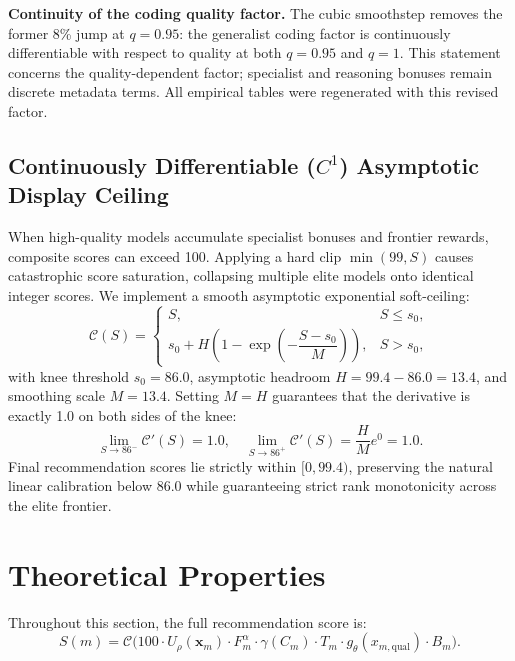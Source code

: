\documentclass[pdflatex,sn-mathphys-num]{sn-jnl}
\theoremstyle{thmstyleone}
\theoremstyle{thmstylethree}
\begin{document}
\textbf{Continuity of the coding quality factor.} The cubic smoothstep removes the former 8\% jump at $q=0.95$: the generalist coding factor is continuously differentiable with respect to quality at both $q=0.95$ and $q=1$. This statement concerns the quality-dependent factor; specialist and reasoning bonuses remain discrete metadata terms. All empirical tables were regenerated with this revised factor.

\subsection{Continuously Differentiable ($C^1$) Asymptotic Display Ceiling}\label{subsec:ceiling}

When high-quality models accumulate specialist bonuses and frontier rewards, composite scores can exceed 100. Applying a hard clip $\min(99, S)$ causes catastrophic score saturation, collapsing multiple elite models onto identical integer scores. We implement a smooth asymptotic exponential soft-ceiling:
\begin{equation}\label{eq:soft_ceiling}
\mathcal{C}(S) = \begin{cases}
S, & S \le s_0, \\[4pt]
s_0 + H \left( 1 - \exp\left( -\dfrac{S - s_0}{M} \right) \right), & S > s_0,
\end{cases}
\end{equation}
with knee threshold $s_0 = 86.0$, asymptotic headroom $H = 99.4 - 86.0 = 13.4$, and smoothing scale $M = 13.4$. Setting $M = H$ guarantees that the derivative is exactly 1.0 on both sides of the knee:
\begin{equation}\label{eq:c1_ceiling}
\lim_{S \to 86^-} \mathcal{C}'(S) = 1.0, \quad \lim_{S \to 86^+} \mathcal{C}'(S) = \frac{H}{M} e^0 = 1.0.
\end{equation}
Final recommendation scores lie strictly within $[0, 99.4)$, preserving the natural linear calibration below $86.0$ while guaranteeing strict rank monotonicity across the elite frontier.

\section{Theoretical Properties}\label{sec:theory}

Throughout this section, the full recommendation score is:
\begin{equation}
S(m) = \mathcal{C}\Big( 100 \cdot U_\rho(\mathbf{x}_m) \cdot F_m^\alpha \cdot \gamma(C_m) \cdot T_m \cdot g_\theta(x_{m, \text{qual}}) \cdot B_m \Big).
\end{equation}
\end{document}
